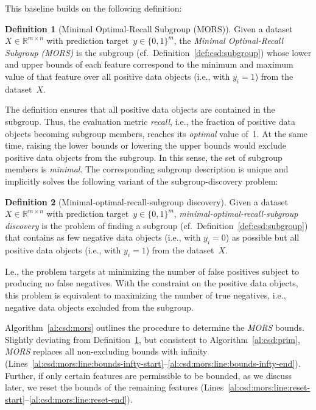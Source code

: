 \documentclass{article}
\theoremstyle{definition}
\newtheorem{definition}{Definition}
\begin{document}
This baseline builds on the following definition:
%
\begin{definition}[Minimal Optimal-Recall Subgroup (MORS)]
	Given a dataset $X \in \mathbb{R}^{m \times n}$ with prediction target~$y \in \{0, 1\}^m$,
	the \emph{Minimal Optimal-Recall Subgroup (MORS)} is the subgroup (cf.~Definition~\ref{def:csd:subgroup}) whose lower and upper bounds of each feature correspond to the minimum and maximum value of that feature over all positive data objects (i.e., with $y_i = 1$) from the dataset~$X$.
	\label{def:csd:mors}
\end{definition}
%
The definition ensures that all positive data objects are contained in the subgroup.
Thus, the evaluation metric \emph{recall}, i.e., the fraction of positive data objects becoming subgroup members, reaches its \emph{optimal} value of~1.
At the same time, raising the lower bounds or lowering the upper bounds would exclude positive data objects from the subgroup.
In this sense, the set of subgroup members is \emph{minimal}.
The corresponding subgroup description is unique and implicitly solves the following variant of the subgroup-discovery problem:
%
\begin{definition}[Minimal-optimal-recall-subgroup discovery]
	Given a dataset $X \in \mathbb{R}^{m \times n}$ with prediction target~$y \in \{0, 1\}^m$,
	\emph{minimal-optimal-recall-subgroup discovery} is the problem of finding a subgroup (cf.~Definition~\ref{def:csd:subgroup}) that contains as few negative data objects (i.e., with $y_i = 0$) as possible but all positive data objects (i.e., with $y_i = 1$) from the dataset~$X$.
	\label{def:csd:minimal-optimal-recall-subgroup-discovery}
\end{definition}
%
I.e., the problem targets at minimizing the number of false positives subject to producing no false negatives.
With the constraint on the positive data objects, this problem is equivalent to maximizing the number of true negatives, i.e., negative data objects excluded from the subgroup.

Algorithm~\ref{al:csd:mors} outlines the procedure to determine the \emph{MORS} bounds.
Slightly deviating from Definition~\ref{def:csd:mors}, but consistent to Algorithm~\ref{al:csd:prim}, \emph{MORS} replaces all non-excluding bounds with infinity (Lines~\ref{al:csd:mors:line:bounds-infty-start}--\ref{al:csd:mors:line:bounds-infty-end}).
Further, if only certain features are permissible to be bounded, as we discuss later, we reset the bounds of the remaining features (Lines~\ref{al:csd:mors:line:reset-start}--\ref{al:csd:mors:line:reset-end}).
\end{document}
